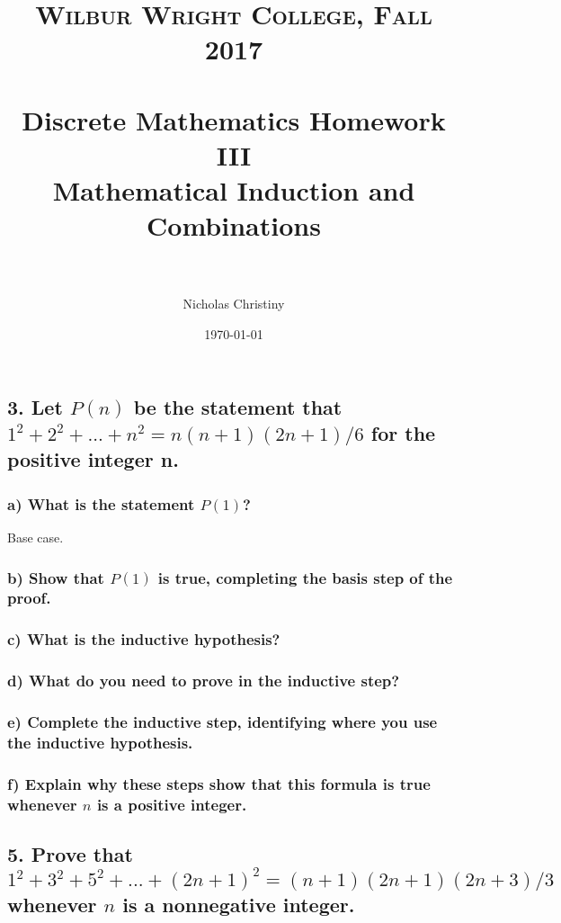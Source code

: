 \documentclass[11pt, oneside]{article} %
\title{
\normalfont \normalsize
\textsc{Wilbur Wright College, Fall 2017} \\ [25pt] %
\horrule{0.5pt} \\[0.4cm] %
\huge Discrete Mathematics Homework III \\
\huge Mathematical Induction and Combinations \\ %
\horrule{2pt} \\[0.5cm] %
}
\author{Nicholas Christiny} %
\date{\normalsize\today} %
\numberwithin{equation}{section} %
\numberwithin{figure}{section} %
\numberwithin{table}{section} %
\begin{document}
\maketitle %


\section{}
\subsection{3. Let $P(n)$ be the statement that $1^2 + 2^2 +...+n^2 = n(n + 1)(2n + 1)/6$ for the positive integer n.}
\subsubsection{a) What is the statement $P(1)$?}
Base case.
\subsubsection{b) Show that $P(1)$ is true, completing the basis step of the proof.}
\subsubsection{c) What is the inductive hypothesis?}
\subsubsection{d) What do you need to prove in the inductive step?}
\subsubsection{e) Complete the inductive step, identifying where you use the inductive hypothesis.}
\subsubsection{f) Explain why these steps show that this formula is true whenever $n$ is a positive integer.}

\subsection{5. Prove that $1^2 +3^2 +5^2 +...+(2n+1)^2 =(n+1) (2n + 1)(2n + 3)/3$ whenever $n$ is a nonnegative integer.}
\end{document}
